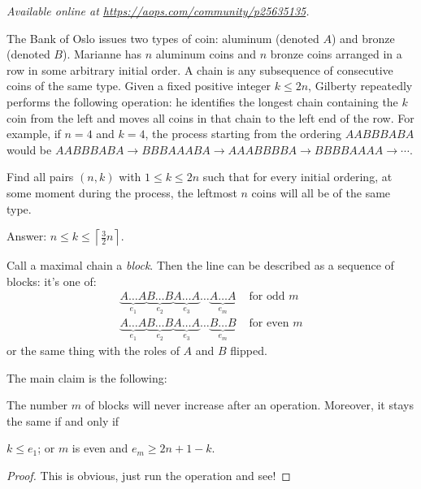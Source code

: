 \textsl{Available online at \url{https://aops.com/community/p25635135}.}
\begin{mdframed}[style=mdpurplebox,frametitle={Problem statement}]
The Bank of Oslo issues two types of coin: aluminum (denoted $A$) and bronze
(denoted $B$). Marianne has $n$ aluminum coins and $n$ bronze coins arranged in a
row in some arbitrary initial order.
A chain is any subsequence of consecutive coins of the same type.
Given a fixed positive integer $k \leq 2n$,
Gilberty repeatedly performs the following operation:
he identifies the longest chain containing the $k$ coin from the left
and moves all coins in that chain to the left end of the row.
For example, if $n=4$ and $k=4$, the process starting
from the ordering $AABBBABA$ would be
$AABBBABA \to BBBAAABA \to AAABBBBA \to BBBBAAAA \to \dotsb$.

Find all pairs $(n,k)$ with $1 \leq k \leq 2n$
such that for every initial ordering,
at some moment during the process,
the leftmost $n$ coins will all be of the same type.
\end{mdframed}
Answer: $n \le k \le \left\lceil \frac 32 n \right\rceil$.

Call a maximal chain a \emph{block}.
Then the line can be described as a sequence of blocks: it's one of:
\begin{align*}
  \underbrace{A\dots A}_{e_1}
  \underbrace{B\dots B}_{e_2}
  \underbrace{A\dots A}_{e_3}
  \dots
  \underbrace{A\dots A}_{e_m} & \text{ for odd $m$} \\
  \underbrace{A\dots A}_{e_1}
  \underbrace{B\dots B}_{e_2}
  \underbrace{A\dots A}_{e_3}
  \dots
  \underbrace{B\dots B}_{e_m} & \text{ for even $m$}
\end{align*}
or the same thing with the roles of $A$ and $B$ flipped.

The main claim is the following:
\begin{claim*}
  The number $m$ of blocks will never increase after an operation.
  Moreover, it stays the same if and only if
  \begin{itemize}
    \ii $k \le e_1$; or
    \ii $m$ is even and $e_m \ge 2n+1-k$.
  \end{itemize}
\end{claim*}
\begin{proof}
  This is obvious, just run the operation and see!
\end{proof}

